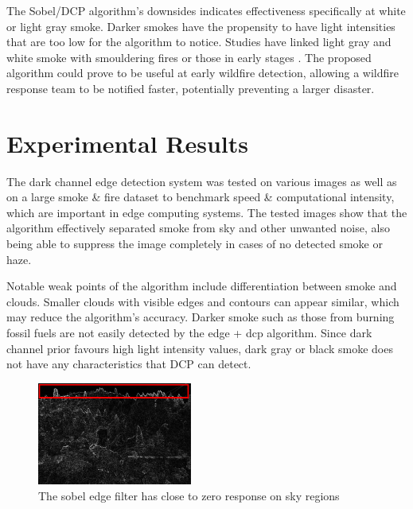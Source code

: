 \documentclass[lettersize,journal]{IEEEtran}
\begin{document}
The Sobel/DCP algorithm's downsides indicates effectiveness specifically at white or light gray smoke. Darker smokes have the propensity to have light intensities that are too low for the algorithm to notice. Studies have linked light gray and white smoke with smouldering fires or those in early stages \cite{smokecolour}. The proposed algorithm could prove to be useful at early wildfire detection, allowing a wildfire response team to be notified faster, potentially preventing a larger disaster.


\section{Experimental Results}

The dark channel edge detection system was tested on various images as
well as on a large smoke \& fire dataset to benchmark speed \&
computational intensity, which are important in edge computing systems.
The tested images show that the algorithm effectively separated smoke
from sky and other unwanted noise, also being able to suppress the image
completely in cases of no detected smoke or haze.

Notable weak points of the algorithm include differentiation between
smoke and clouds. Smaller clouds with visible edges and contours can
appear similar, which may reduce the algorithm's accuracy. Darker smoke
such as those from burning fossil fuels are not easily detected by the
edge + dcp algorithm. Since dark channel prior favours high light
intensity values, dark gray or black smoke does not have any
characteristics that DCP can detect.

\begin{figure}
        \centering
        \includegraphics[width=2in]{sobelsky.png}
        \caption{The sobel edge filter has close to zero response on sky
        regions}
        \label{sobelsky}
\end{figure}
\end{document}
